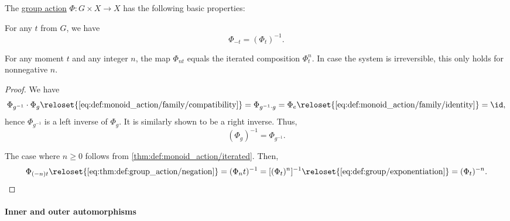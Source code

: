 \begin{proposition}\label{thm:def:group_action}
  The \hyperref[def:group_action]{group action} \( \Phi: G \times X \to X \) has the following basic properties:
  \begin{thmenum}
     For any \( t \) from \( G \), we have
    \begin{equation}\label{eq:thm:def:group_action/negation}
      \Phi_{-t} = (\Phi_t)^{-1}.
    \end{equation}

     For any moment \( t \) and any integer \( n \), the map \( \Phi_{nt} \) equals the iterated composition \( \Phi_t^n \). In case the system is irreversible, this only holds for nonnegative \( n \).
  \end{thmenum}
\end{proposition}
\begin{proof}
   We have
  \begin{equation*}
    \Phi_{g^{-1}} \cdot \Phi_g
    \reloset {\eqref{eq:def:monoid_action/family/compatibility}} =
    \Phi_{g^{-1} \cdot g}
    =
    \Phi_e
    \reloset {\eqref{eq:def:monoid_action/family/identity}} =
    \id,
  \end{equation*}
  hence \( \Phi_{g^{-1}} \) is a left inverse of \( \Phi_g \). It is similarly shown to be a right inverse. Thus,
  \begin{equation*}
    (\Phi_g)^{-1} = \Phi_{g^{-1}}.
  \end{equation*}

   The case where \( n \geq 0 \) follows from \cref{thm:def:monoid_action/iterated}. Then,
  \begin{equation*}
    \Phi_{(-n)t}
    \reloset {\eqref{eq:thm:def:group_action/negation}} =
    (\Phi_nt)^{-1}
    =
    [(\Phi_t)^n]^{-1}
    \reloset {\eqref{eq:def:group/exponentiation}} =
    (\Phi_t)^{-n}.
  \end{equation*}
\end{proof}

\paragraph{Inner and outer automorphisms}

